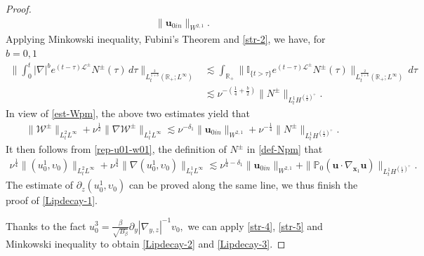 \documentclass[11pt,reqno]{article}
\numberwithin{equation}{section}
\newcommand\R{{\mathbb R}}
\newcommand\PP{{\mathbb P}}
\newcommand\W{{\mathcal W}}
\newcommand\x{\bm{x}}
\newcommand\up{\upsilon}
\newcommand\uu{\bm{u}}
\newcommand\FF{\bm{F}}
\let\pa=\partial
\let\f=\frac
\begin{document}
\begin{proof}
\begin{align}
	\|\uu_{0in}\|_{W^{2,1}}.
\end{align}
Applying Minkowski inequality, Fubini's Theorem and \eqref{str-2}, we have, for $b=0,1$
\begin{align*}%
    \big\|\int_0^t  |\nabla|^b e^{(t-\tau)\mathcal{L}^{\pm}} N^{\pm} (\tau)\, d\tau \big\|_{L^{\f{2}{1+b}}_t(\R_{+};L^\infty)}
   & \lesssim 
    \int_{\R_{+}}\|\mathbb{I}_{\{t>\tau \}} e^{(t-\tau)\mathcal{L}^{\pm}} N^{\pm} (\tau)\|_{L^{\f{2}{1+b}}_t(\R_{+};L^\infty)} \, d\tau \\
&\lesssim \nu^{-(\f14+\f{b}{2})} \|N^{\pm}\|_{L^1_tH^{(\f12)^+}}.
\end{align*}
In view of \eqref{est-Wpm}, the above two estimates yield that
\begin{align*}%
\|\W^{\pm}\|_{L_t^2L^{\infty}}+\nu^{\f12}\|\nabla \W^{\pm}\|_{L_t^1L^{\infty}}
    \lesssim 
    \nu^{-\delta_1}
	\|\uu_{0in}\|_{W^{2,1}}
    +\nu^{-\f14} \|N^{\pm}\|_{L^1_tH^{(\f12)^+}}.
\end{align*}
It then follows from \eqref{rep-u01-w01}, the definition of $N^{\pm}$ in \eqref{def-Npm}
that
\begin{align}\label{est-u01w01-1}
	\nu^{\f14}
	\|(u_0^1,\up_0)\|_{L^2_tL^\infty} +\nu^{\f34}\|\nabla (u_0^1,\up_0)\|_{L_t^1L^{\infty}}\lesssim  \nu^{\f14-\delta_1}\|\uu_{0in}\|_{W^{2,1}}+\|\PP_0(\uu\cdot\nabla_{\x_1}  \uu)\|_{L^1_tH^{(\f12)^+}}.
\end{align}
The estimate of $\pa_z(u_0^1,\up_0)$ can be proved along the same line, we thus finish the proof of \eqref{Lipdecay-1}. 

Thanks to the fact $u_0^3=\f{\beta}{\sqrt{B_{\beta}}} \pa_y|\nabla_{y,z}|^{-1}v_0,$ we can apply \eqref{str-4}, \eqref{str-5} and Minkowski inequality
to obtain \eqref{Lipdecay-2} and \eqref{Lipdecay-3}.  



\end{proof}
\end{document}
